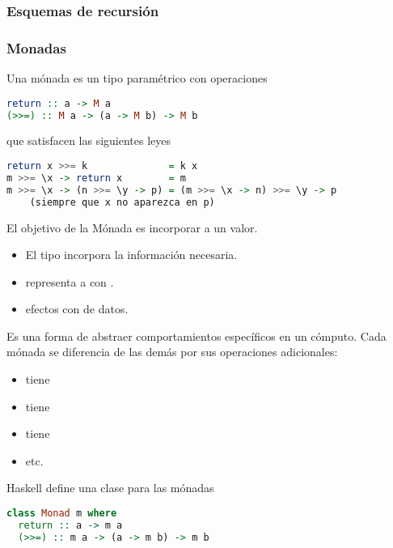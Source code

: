 \subsubsection{Esquemas de recursión}

\subsubsection{Monadas}

Una mónada es un tipo paramétrico  con operaciones

\begin{lstlisting}[language=Haskell]
return :: a -> M a
(>>=) :: M a -> (a -> M b) -> M b
\end{lstlisting}

que satisfacen las siguientes leyes

\begin{lstlisting}[language=Haskell]
return x >>= k              = k x
m >>= \x -> return x        = m
m >>= \x -> (n >>= \y -> p) = (m >>= \x -> n) >>= \y -> p
    (siempre que x no aparezca en p)
\end{lstlisting}

El objetivo de la Mónada es incorporar  a un valor.
\begin{itemize}
  \item El tipo  incorpora la información necesaria.
  \item {} representa a  con .
  \item \xtt{($>>=$)}  efectos con  de datos.
\end{itemize}

Es una forma de abstraer comportamientos específicos en un cómputo. Cada mónada se diferencia de las demás por sus operaciones adicionales:
\begin{itemize}
  \item {} tiene 
  \item {} tiene 
  \item {} tiene 
  \item etc.
\end{itemize}

Haskell define una clase para las mónadas

\begin{lstlisting}[language=Haskell]
class Monad m where
  return :: a -> m a
  (>>=) :: m a -> (a -> m b) -> m b
\end{lstlisting}

